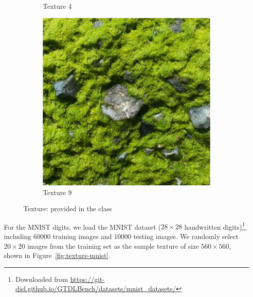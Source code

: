 \documentclass{article}
\begin{document}
\begin{figure}[htbp!]
\begin{subfigure}[b]{0.3\textwidth}
        \caption{Texture 4}
        \label{fig:texture-4}
    \end{subfigure}
    \hfill %
    \begin{subfigure}[b]{0.3\textwidth}
        \includegraphics[width=\textwidth]{../Code/Textures/9.png}
        \caption{Texture 9}
        \label{fig:texture-9}
    \end{subfigure}
    \caption{Texture: provided in the class}
    \label{fig:texture-class}
\end{figure}

For the MNIST digits, we load the MNIST dataset ($28 \times 28$ handwritten digits)\footnote{Downloaded from \url{https://git-disl.github.io/GTDLBench/datasets/mnist_datasets/}}, including 60000 training images and 10000 testing images. 
We randomly select $20 \times 20$ images from the training set as the sample texture of size $560 \times 560$, shown in Figure~\ref{fig:texture-mnist}.
\end{document}

